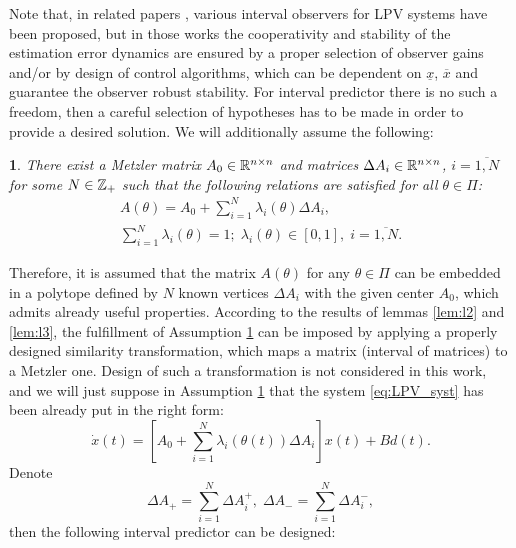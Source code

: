 \documentclass[twocolumn,english]{IEEEtran}
\theoremstyle{plain}
\theoremstyle{definition}
\theoremstyle{plain}
\newtheorem{assumption}{\protect\assumptionname}
\theoremstyle{plain}
\theoremstyle{remark}
\providecommand{\assumptionname}{Assumption}
\begin{document}
Note that, in related papers \cite{AitRami2008,RVZ10,Bolajraf2011,Efimov_a2013,Efimov_tac2013,Chebotarev2015}, various interval observers for LPV systems have been proposed, but in those works the cooperativity and stability of the estimation error dynamics are ensured by a proper selection of observer gains and/or by design of control algorithms, which can be dependent on $\underline{x}$, $\overline{x}$ and guarantee the observer robust stability. For interval predictor there is no such a freedom, then a careful selection of hypotheses has to be made in order to provide a desired solution.
We will additionally assume the following:
\begin{assumption}
\label{ass:a3} There exist a Metzler matrix $A_{0}\in\mathbb{R}^{n\times n}$ and matrices $\Delta A_{i}\in\mathbb{R}^{n\times n}$, $i=\overline{1,N}$ for some $N\in\mathbb{Z}_{+}$ such that the following relations are satisfied for all $\theta\in\Pi$:
\begin{gather*}
A(\theta)=A_{0}+\sum_{i=1}^{N}\lambda_{i}(\theta)\Delta A_{i},\\
\sum_{i=1}^{N}\lambda_{i}(\theta)=1;\;\lambda_{i}(\theta)\in[0,1],\;i=\overline{1,N}.
\end{gather*}
\end{assumption}
Therefore, it is assumed that the matrix $A(\theta)$ for any $\theta\in\Pi$ can be embedded in a polytope defined by $N$ known vertices $\Delta A_{i}$ with the given center $A_{0}$, which admits already useful properties. According to the results of lemmas \ref{lem:l2} and \ref{lem:l3}, the fulfillment of Assumption \ref{ass:a3} can be imposed by applying a properly designed similarity transformation, which maps a matrix (interval of matrices) to a Metzler one. Design of such a transformation is not considered in this work, and we will just suppose in Assumption \ref{ass:a3} that the system \eqref{eq:LPV_syst} has been already put in the right form:
\[
\dot{x}(t)=[A_{0}+\sum_{i=1}^{N}\lambda_{i}(\theta(t))\Delta A_{i}]x(t)+Bd(t).
\]
Denote
\[
\Delta A_{+}=\sum_{i=1}^{N}\Delta A_{i}^{+},\;\Delta A_{-}=\sum_{i=1}^{N}\Delta A_{i}^{-},
\]
then the following interval predictor can be designed:
\end{document}
